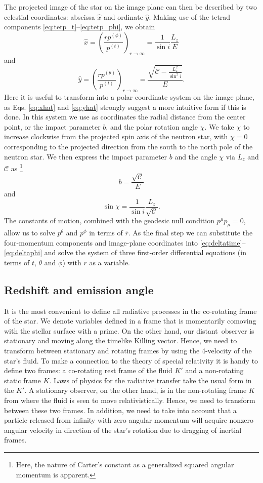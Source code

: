 \documentclass{aa}
\newcommand{\be}{\begin{equation}}
\newcommand{\ee}{\end{equation}}
\newcommand{\refe}[1]{#1}
\newcommand{\Ca}{\ensuremath{\mathcal{C}}}
\newcommand{\rb}{\ensuremath{\bar{r}}}
\begin{document}
The projected image of the star on the image plane can then be described by two celestial coordinates:
abscissa $\hat{x}$ and ordinate $\hat{y}$.
Making use of the tetrad components \eqref{eq:tetp_t}--\eqref{eq:tetp_phi}, we obtain \citep[][p.347]{cha}
\be\label{eq:xhat}
\hat{x} = \left( \frac{rp^{(\phi)}}{p^{(t)}} \right)_{r \rightarrow \infty} = \frac{1}{\sin i} \frac{L_z}{E}
\ee
and
\be\label{eq:yhat}
\hat{y} = \left( \frac{rp^{(\theta)}}{p^{(t)}} \right)_{r \rightarrow \infty} = \frac{\sqrt{\Ca - \frac{L_z^2}{\sin^2 i}}}{E}.
\ee
Here it is useful to transform into a polar coordinate system on the image plane, as Eqs. \eqref{eq:xhat} and \eqref{eq:yhat} strongly suggest a more intuitive form if this is done. 
In this system we use as coordinates the radial distance from the center point, or the impact parameter $b$, and the polar rotation angle $\chi$.  
We take $\chi$ to increase clockwise from the projected spin axis of the neutron star, with $\chi=0$ corresponding to the projected direction from the south to the north pole of the neutron star.  
We then express the impact parameter $b$ and the angle $\chi$ via $L_z$ and $\Ca$ as%
\footnote{
    Here, the nature of Carter's constant as a generalized squared
    angular momentum is apparent.
}
\be
b = \frac{\sqrt{\Ca}}{E}
\ee
and
\be
\sin \chi = \frac{1}{\sin i} \frac{L_z}{\sqrt{\Ca}}.
\ee
The constants of motion, combined with the geodesic null condition $p^\mu p_\mu = 0$, allow us to solve $p^\theta$ and $p^\phi$ in terms of $\rb$.
As the final step we can substitute the four-momentum components and image-plane coordinates into \eqref{eq:deltatime}--\eqref{eq:deltaphi} and solve the system of three first-order differential equations (in terms of $t$, $\theta$ and $\phi$) with $\rb$ as a variable.


\subsection{Redshift and emission angle}\label{sect:redshift_angle}
It is the most convenient to define all radiative processes in the co-rotating frame of the star.
We denote variables defined in a frame that is momentarily comoving with the stellar surface with a prime.  
On the other hand, our \refe{distant} observer is stationary and moving along the timelike Killing vector.  
Hence, we need to transform between stationary and rotating frames by using the 4-velocity of the star's fluid.  
To make a connection to the theory of special relativity it is handy to define two frames: 
a co-rotating rest frame of the fluid $K'$ and a non-rotating static frame $K$.
Laws of physics for the radiative transfer take the usual form in the $K'$.
\refe{A stationary observer, on the other hand,} is in the non-rotating frame $K$ from where the fluid is seen to move relativistically.
\refe{Hence, we need to transform between these two frames.}
In addition, we need to take into account that a particle released from infinity with zero angular momentum will acquire nonzero angular velocity in direction of the star's rotation due to dragging of inertial frames.
\end{document}
